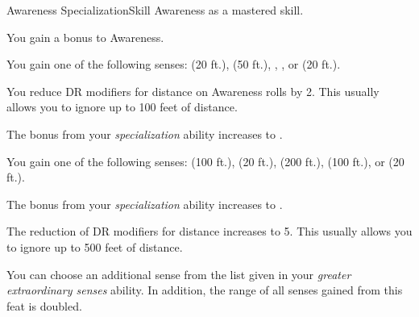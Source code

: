     \begin{feat}{Awareness Specialization}{Skill}
        \featpre Awareness as a mastered skill.

         You gain a  bonus to Awareness.

         You gain one of the following senses:  (20 ft.),  (50 ft.), , , or  (20 ft.).

         You reduce DR modifiers for distance on Awareness rolls by 2.
        This usually allows you to ignore up to 100 feet of distance.

         The bonus from your \textit{specialization} ability increases to .

         You gain one of the following senses:  (100 ft.),  (20 ft.),  (200 ft.),  (100 ft.), or  (20 ft.).

         The bonus from your \textit{specialization} ability increases to .

         The reduction of DR modifiers for distance increases to 5.
        This usually allows you to ignore up to 500 feet of distance.

         You can choose an additional sense from the list given in your \textit{greater extraordinary senses} ability.
        In addition, the range of all senses gained from this feat is doubled.
    \end{feat}

